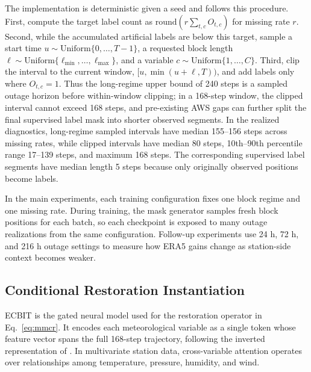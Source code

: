 The implementation is deterministic given a seed and follows this procedure. First, compute the target label count as $\mathrm{round}(r\sum_{t,c}O_{t,c})$ for missing rate $r$. Second, while the accumulated artificial labels are below this target, sample a start time $u\sim\mathrm{Uniform}\{0,\ldots,T-1\}$, a requested block length $\ell\sim\mathrm{Uniform}\{\ell_{\min},\ldots,\ell_{\max}\}$, and a variable $c\sim\mathrm{Uniform}\{1,\ldots,C\}$. Third, clip the interval to the current window, $[u,\min(u+\ell,T))$, and add labels only where $O_{t,c}=1$. Thus the long-regime upper bound of 240 steps is a sampled outage horizon before within-window clipping; in a 168-step window, the clipped interval cannot exceed 168 steps, and pre-existing AWS gaps can further split the final supervised label mask into shorter observed segments. In the realized diagnostics, long-regime sampled intervals have median 155--156 steps across missing rates, while clipped intervals have median 80 steps, 10th--90th percentile range 17--139 steps, and maximum 168 steps. The corresponding supervised label segments have median length 5 steps because only originally observed positions become labels.

In the main experiments, each training configuration fixes one block regime and one missing rate. During training, the mask generator samples fresh block positions for each batch, so each checkpoint is exposed to many outage realizations from the same configuration. Follow-up experiments use 24 h, 72 h, and 216 h outage settings to measure how ERA5 gains change as station-side context becomes weaker.

\subsection{Conditional Restoration Instantiation}
ECBIT is the gated neural model used for the restoration operator in Eq.~\ref{eq:mmcr}. It encodes each meteorological variable as a single token whose feature vector spans the full 168-step trajectory, following the inverted representation of \citet{liu2024itransformer}. In multivariate station data, cross-variable attention operates over relationships among temperature, pressure, humidity, and wind.

